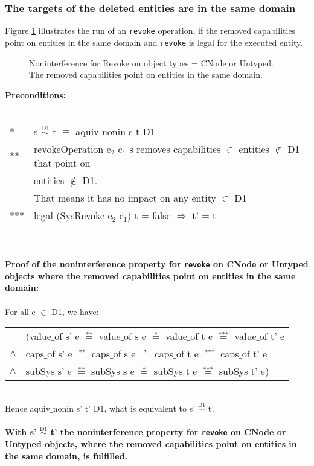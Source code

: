 \subsubsection{The targets of the deleted entities are in the same domain}
Figure \ref{fig:RevokeCNode} illustrates the run of an \texttt{revoke} operation, if the removed capabilities point on entities in the same domain and \texttt{revoke} is legal for the executed entity.
\begin{figure}[H]
\caption{Noninterference for Revoke on object types = CNode or Untyped. The removed capabilities point on entities in the same domain.}
\label{fig:RevokeCNode}
\end{figure}
\textbf{Preconditions:} \\ \\
\begin{tabular}{ll}
* & s $\overset{\text{D1}}{\sim}$ t $\equiv$ aquiv$\_$nonin s t D1	\\ 
** & revokeOperation e$_2$ c$_1$ s removes capabilities $\in$ entities $\notin$ D1 that point on \\
& entities $\notin$ D1. \\
& That means it has no impact on any entity $\in$ D1 \\ 
*** & legal (SysRevoke e$_2$ c$_1$) t = false $\Rightarrow$ t' = t
\end{tabular} \\ \\ 
\textbf{Proof of the noninterference property for \texttt{revoke} on CNode or Untyped objects where the removed capabilities point on entities in the same domain:}\\ \\
For all e $\in$ D1, we have: \\ 
\begin{tabular}{ll}
& (value$\_$of s' e $\overset{\text{**}}{=}$ value$\_$of s e $\overset{\text{*}}{=}$ value$\_$of t e $\overset{\text{***}}{=}$ value$\_$of t' e \\
$\wedge$ & caps$\_$of s' e $\overset{\text{**}}{=}$ caps$\_$of s e $\overset{\text{*}}{=}$ caps$\_$of t e $\overset{\text{***}}{=}$ caps$\_$of t' e \\
$\wedge$ & subSys s' e $\overset{\text{**}}{=}$ subSys s e $\overset{\text{*}}{=}$ subSys t e $\overset{\text{***}}{=}$ subSys t' e)
\end{tabular} \\
Hence aquiv$\_$nonin s' t' D1, what is equivalent to s' $\overset{\text{D1}}{\sim}$ t'.\\ \\ 
\textbf{With s' $\overset{\text{D1}}{\sim}$ t' the noninterference property for \texttt{revoke} on CNode or Untyped objects, where the removed capabilities point on entities in the same domain, is fulfilled.}  
